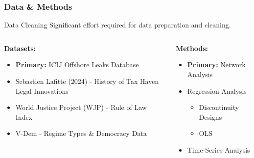 \documentclass{beamer}
\begin{document}
\begin{frame}
    \frametitle{Data \& Methods}

    \begin{alertblock}{Data Cleaning}
        Significant effort required for data preparation and cleaning.
    \end{alertblock}

    \begin{columns}[T]
        \begin{column}{0.5\textwidth}
            \textbf{Datasets:}
            \begin{itemize}
                \item \textbf{Primary:} ICIJ Offshore Leaks Database
                \item Sebastien Lafitte (2024) - History of Tax Haven Legal Innovations
                \item World Justice Project (WJP) - Rule of Law Index
                \item V-Dem - Regime Types \& Democracy Data
            \end{itemize}
        \end{column}
        \begin{column}{0.5\textwidth}
            \textbf{Methods:}
            \begin{itemize}
                \item \textbf{Primary:} Network Analysis
                \item Regression Analysis
                \begin{itemize}
                    \item Discontinuity Designs
                    \item OLS
                \end{itemize}
                \item Time-Series Analysis
            \end{itemize}
        \end{column}
    \end{columns}
\end{frame}
\end{document}
